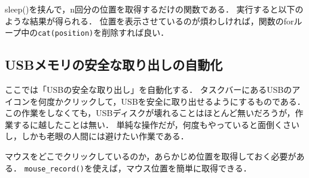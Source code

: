 \documentclass[
]{article}
\newenvironment{Shaded}{\begin{snugshade}}{\end{snugshade}}
\newcommand{\AttributeTok}[1]{\textcolor[rgb]{0.13,0.29,0.53}{#1}}
\newcommand{\DecValTok}[1]{\textcolor[rgb]{0.00,0.00,0.81}{#1}}
\newcommand{\DocumentationTok}[1]{\textcolor[rgb]{0.56,0.35,0.01}{\textbf{\textit{#1}}}}
\newcommand{\FunctionTok}[1]{\textcolor[rgb]{0.13,0.29,0.53}{\textbf{#1}}}
\newcommand{\NormalTok}[1]{#1}
\newcommand{\OtherTok}[1]{\textcolor[rgb]{0.56,0.35,0.01}{#1}}
\newcommand{\SpecialCharTok}[1]{\textcolor[rgb]{0.81,0.36,0.00}{\textbf{#1}}}
\begin{document}
sleep()を挟んで，n回分の位置を取得するだけの関数である．
実行すると以下のような結果が得られる．
位置を表示させているのが煩わしければ，関数のforループ中の\texttt{cat(position)}を削除すれば良い．

\begin{Shaded}
\end{Shaded}

\hypertarget{usbux30e1ux30e2ux30eaux306eux5b89ux5168ux306aux53d6ux308aux51faux3057ux306eux81eaux52d5ux5316}{%
\subsection{USBメモリの安全な取り出しの自動化}\label{usbux30e1ux30e2ux30eaux306eux5b89ux5168ux306aux53d6ux308aux51faux3057ux306eux81eaux52d5ux5316}}

ここでは「USBの安全な取り出し」を自動化する．
タスクバーにあるUSBのアイコンを何度かクリックして，USBを安全に取り出せるようにするものである．
この作業をしなくても，USBディスクが壊れることはほとんど無いだろうが，作業するに越したことは無い．
単純な操作だが，何度もやっていると面倒くさいし，しかも老眼の人間には避けたい作業である．

マウスをどこでクリックしているのか，あらかじめ位置を取得しておく必要がある．
\texttt{mouse\_record()}を使えば，マウス位置を簡単に取得できる．

\begin{Shaded}
\end{Shaded}
\end{document}

